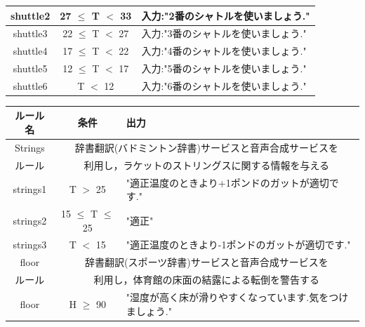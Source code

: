 \documentclass{kuisthesis}			%
\begin{document}
\begin{itemize}
\begin{table}[p]
\begin{center}
\begin{tabularx}{\linewidth}{|c|c|X|}
      shuttle2 & 27 $\leq$ T $<$ 33 & 入力:"2番のシャトルを使いましょう."  \\ \hline
      shuttle3 & 22 $\leq$ T $<$ 27& 入力:"3番のシャトルを使いましょう."  \\ \hline
      shuttle4 & 17 $\leq$ T $<$ 22 & 入力:"4番のシャトルを使いましょう."  \\ \hline
      shuttle5 & 12 $\leq$ T $<$ 17 & 入力:"5番のシャトルを使いましょう."  \\ \hline
      shuttle6 & T $<$ 12 & 入力:"6番のシャトルを使いましょう." \\ \hline \hline
    \end{tabularx}
    \label{tab:drl}
  \end{center}
\end{table}

\begin{table}[htb]
    \begin{tabularx}{\linewidth}{|c|c|X|} \hline
      ルール名 & 条件 & 出力 \\ \hline \hline
      Strings & \multicolumn{2}{c|}{辞書翻訳(バドミントン辞書)サービスと音声合成サービスを} \\
      ルール & \multicolumn{2}{c|}{利用し，ラケットのストリングスに関する情報を与える} \\ \hline \hline
      strings1 & T $>$ 25 & "適正温度のときより+1ポンドのガットが適切です."  \\ \hline
      strings2 & 15 $\leq$ T $\leq$ 25 & "適正" \\ \hline
      strings3 & T $<$ 15 & "適正温度のときより-1ポンドのガットが適切です." \\ \hline
      floor & \multicolumn{2}{c|}{辞書翻訳(スポーツ辞書)サービスと音声合成サービスを} \\
      ルール & \multicolumn{2}{c|}{利用し，体育館の床面の結露による転倒を警告する} \\ \hline \hline
      floor & H $\geq$ 90 & "湿度が高く床が滑りやすくなっています.気をつけましょう." \\ \hline
    \end{tabularx}
\end{table}

\end{itemize}
\end{document}
